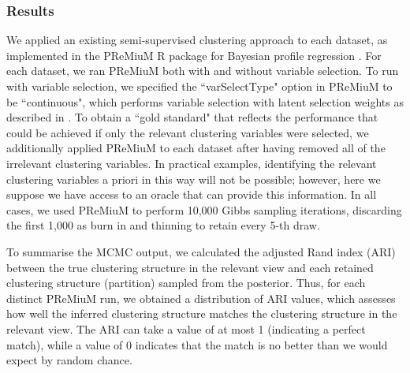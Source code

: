 \documentclass[12pt]{article}
\begin{document}
\subsubsection{Results}\label{simresults}
 We applied an existing semi-supervised clustering approach to each dataset, as implemented in the PReMiuM R package for Bayesian profile regression \citep{Liverani2015}.  For each dataset, we ran PReMiuM both with and without variable selection.  To run with variable selection, we specified the ``varSelectType" option in PReMiuM to be ``continuous", which performs variable selection with latent selection weights as described in \citet{Papathomas2012}.  To obtain a ``gold standard" that reflects the performance that could be achieved if only the relevant clustering variables were selected, we additionally applied PReMiuM to each dataset after having removed all of the irrelevant clustering variables.  In practical examples, identifying the relevant clustering variables a priori in this way will not be possible; however, here we suppose we have access to an oracle that can provide this information.  In all cases, we used PReMiuM to perform 10,000 Gibbs sampling iterations, discarding the first 1,000 as burn in and thinning to retain every 5-th draw.

To summarise the MCMC output, we calculated the adjusted Rand index (ARI) between the true clustering structure in the relevant view and each retained clustering structure (partition) sampled from the posterior.  Thus, for each distinct PReMiuM run, we obtained a distribution of ARI values, which assesses how well the inferred clustering structure matches the clustering structure in the relevant view.  The ARI can take a value of at most 1 (indicating a perfect match), while a value of 0 indicates that the match is no better than we would expect by random chance.  
\end{document}
